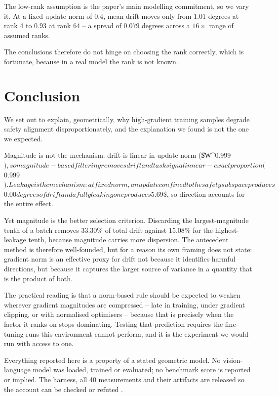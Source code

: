\documentclass[10pt,journal,compsoc,twocolumn]{IEEEtran}
\begin{document}
The low-rank assumption is the paper's main modelling commitment, so we vary it. At a fixed update norm of $0.4$, mean drift moves only from $1.01$ degrees at rank $4$ to $0.93$ at rank $64$ -- a spread of $0.079$ degrees across a $16\times$ range of assumed ranks.

The conclusions therefore do not hinge on choosing the rank correctly, which is fortunate, because in a real model the rank is not known.




\section{Conclusion}


We set out to explain, geometrically, why high-gradient training samples degrade safety alignment disproportionately, and the explanation we found is not the one we expected.

Magnitude is not the mechanism: drift is linear in update norm (\$\|\Delta W\|^{0.999}$), so magnitude-based filtering removes drift and task signal in near-exact proportion ($0.999\times$). Leakage is the mechanism: at fixed norm, an update confined to the safety subspace produces $0.00$ degrees of drift and a fully leaking one produces $5.69\$, so direction accounts for the entire effect.

Yet magnitude is the better selection criterion. Discarding the largest-magnitude tenth of a batch removes $33.30\%$ of total drift against $15.08\%$ for the highest-leakage tenth, because magnitude carries more dispersion. The antecedent method is therefore well-founded, but for a reason its own framing does not state: gradient norm is an effective proxy for drift not because it identifies harmful directions, but because it captures the larger source of variance in a quantity that is the product of both.

The practical reading is that a norm-based rule should be expected to weaken wherever gradient magnitudes are compressed -- late in training, under gradient clipping, or with normalised optimisers -- because that is precisely when the factor it ranks on stops dominating. Testing that prediction requires the fine-tuning runs this environment cannot perform, and it is the experiment we would run with access to one.

Everything reported here is a property of a stated geometric model. No vision-language model was loaded, trained or evaluated; no benchmark score is reported or implied. The harness, all 40 measurements and their artifacts are released so the account can be checked or refuted \cite{arxiv_2604_17215}.
\end{document}
